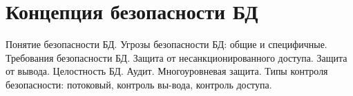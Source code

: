 \section{Концепция безопасности БД}
Понятие безопасности БД. Угрозы безопасности БД: общие и специфичные. Требования безопасности БД. Защита от несанкционированного доступа. Защита от вывода. Целостность БД. Аудит. Многоуровневая защита. Типы контроля безопасности: потоковый, контроль вы-вода, контроль доступа.